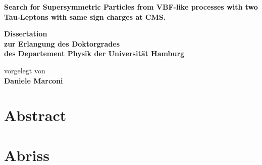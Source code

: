 \documentclass[
twoside=false,
headsepline,     %
headings=normal,
open=any,
numbers=noenddot, %
numbering %
]{scrreprt} %
\author{Daniele Marconi}
\begin{document}
\begin{titlepage}
  \begin{center}
    \thispagestyle{empty}
    \vspace*{1cm}
    \begin{doublespace} 
      \textbf{\huge
      	Search for Supersymmetric Particles from VBF-like processes with two Tau-Leptons with same sign charges at CMS.}
      \vskip2.5cm
      \begin{Large} 
        \textbf{Dissertation\\
          zur Erlangung des Doktorgrades\\
          des Departement Physik
          der Universit\"{a}t Hamburg\\}
      \end{Large}
      \vskip4cm
      \begin{large}
        vorgelegt von\\
        {\textbf{Daniele Marconi} }
        \vfill
      \end{large}
    \end{doublespace} 
  \end{center}
\end{titlepage}

\newpage
\thispagestyle{empty}

\quad
\vfill
{}

\newpage
\thispagestyle{empty}
\section*{Abstract}

\clearpage
\section*{Abriss}

\newpage 
\thispagestyle{empty}
\quad 
\newpage
\end{document}
